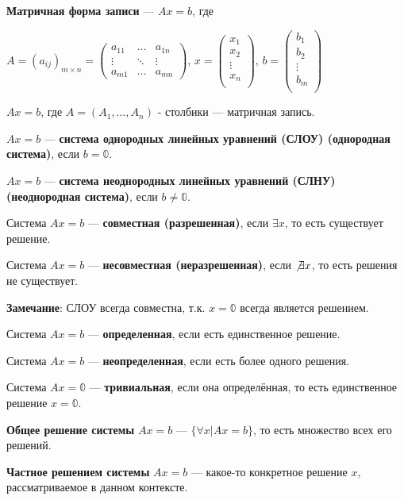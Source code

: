 \documentclass[twoside]{book}
\begin{document}
\textbf{Матричная форма записи} --- \(Ax = b\), где

\(A = (a_{ij})_{m\times n} =
\begin{pmatrix}
    a_{11} & \ldots & a_{1n} \\
    \vdots & \ddots & \vdots \\
    a_{m1} & \ldots & a_{mn}
\end{pmatrix}\),
\(x = \begin{pmatrix}
    x_1 \\
    x_2 \\ \vdots \\ x_n \\
\end{pmatrix}\),
\(b = \begin{pmatrix}
    b_1 \\
    b_2 \\ \vdots \\ b_m \\
\end{pmatrix}\)

\(Ax = b\), где \(A = (A_1, \ldots, A_n)\) - столбики --- матричная запись.


\(Ax = b\) --- \textbf{система однородных линейных уравнений (СЛОУ) (однородная система)}, если \(b = \mathbb{0}\).

\(Ax = b\) --- \textbf{система неоднородных линейных уравнений (СЛНУ) (неоднородная система)}, если \(b \neq \mathbb{0}\).

Система \(Ax = b\) --- \textbf{совместная (разрешенная)}, если \(\exists x\), то есть существует решение.

Система \(Ax = b\) --- \textbf{несовместная (неразрешенная)}, если \(\not\exists x\), то есть решения не существует.

\textbf{Замечание}: СЛОУ всегда совместна, т.к. \(x = \mathbb{0}\) всегда является решением.

Система \(Ax = b\) --- \textbf{определенная}, если есть единственное решение.

Система \(Ax = b\) --- \textbf{неопределенная}, если есть более одного решения.

Система \(Ax = \mathbb{0}\) --- \textbf{тривиальная}, если она определённая, то есть единственное решение \(x = \mathbb{0}\).

\textbf{Общее решение системы} \(Ax = b\) --- \(\{\forall x | Ax = b\}\), то есть множество всех его решений.

\textbf{Частное решением системы} \(Ax = b\) --- какое-то конкретное решение \(x\), рассматриваемое в данном контексте.
\end{document}

